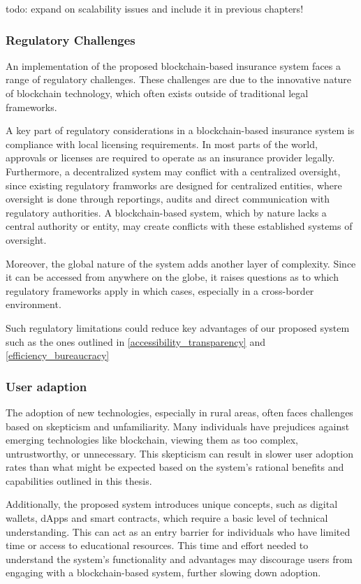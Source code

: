 todo: expand on scalability issues and include it in previous chapters!

\subsubsection{Regulatory Challenges}
An implementation of the proposed blockchain-based insurance system faces a range of regulatory challenges. These challenges are due to the innovative nature of blockchain technology, which often exists outside of traditional legal frameworks.

A key part of regulatory considerations in a blockchain-based insurance system is compliance with local licensing requirements. In most parts of the world, approvals or licenses are required to operate as an insurance provider legally. Furthermore, a decentralized system may conflict with a centralized oversight, since existing regulatory framworks are designed for centralized entities, where oversight is done through reportings, audits and direct communication with regulatory authorities. A blockchain-based system, which by nature lacks a central authority or entity, may create conflicts with these established systems of oversight.

Moreover, the global nature of the system adds another layer of complexity. Since it can be accessed from anywhere on the globe, it raises questions as to which regulatory frameworks apply in which cases, especially in a cross-border environment.

Such regulatory limitations could reduce key advantages of our proposed system such as the ones outlined in \cref{accessibility_transparency} and \cref{efficiency_bureaucracy}

\subsubsection{User adaption}
The adoption of new technologies, especially in rural areas, often faces challenges based on skepticism and unfamiliarity. Many individuals have prejudices against emerging technologies like blockchain, viewing them as too complex, untrustworthy, or unnecessary. This skepticism can result in slower user adoption rates than what might be expected based on the system's rational benefits and capabilities outlined in this thesis.

Additionally, the proposed system introduces unique concepts, such as digital wallets, dApps and smart contracts, which require a basic level of technical understanding. This can act as an entry barrier for individuals who have limited time or access to educational resources. This time and effort needed to understand the system's functionality and advantages may discourage users from engaging with a blockchain-based system, further slowing down adoption.

